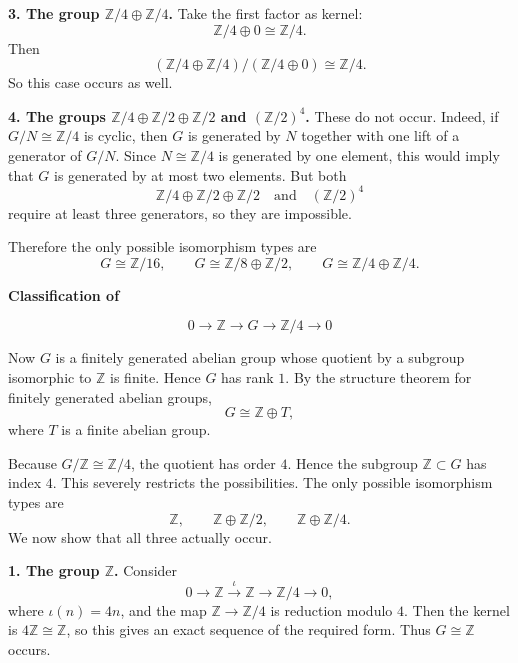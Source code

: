 \begin{solution}
\par

\noindent
\textbf{3. The group \(\mathbb Z/4\oplus \mathbb Z/4\).}
Take the first factor as kernel:
\[
\mathbb Z/4\oplus 0 \cong \mathbb Z/4.
\]
Then
\[
(\mathbb Z/4\oplus \mathbb Z/4)/(\mathbb Z/4\oplus 0)\cong \mathbb Z/4.
\]
So this case occurs as well.

\par

\noindent
\textbf{4. The groups \(\mathbb Z/4\oplus \mathbb Z/2\oplus \mathbb Z/2\) and \((\mathbb Z/2)^4\).}
These do not occur. Indeed, if \(G/N\cong \mathbb Z/4\) is cyclic, then \(G\) is generated by \(N\) together with one lift of a generator of \(G/N\). Since \(N\cong \mathbb Z/4\) is generated by one element, this would imply that \(G\) is generated by at most two elements. But both
\[
\mathbb Z/4\oplus \mathbb Z/2\oplus \mathbb Z/2
\quad \text{and} \quad
(\mathbb Z/2)^4
\]
require at least three generators, so they are impossible.

Therefore the only possible isomorphism types are
\[
\boxed{
	G\cong \mathbb Z/16,
	\qquad
	G\cong \mathbb Z/8\oplus \mathbb Z/2,
	\qquad
	G\cong \mathbb Z/4\oplus \mathbb Z/4.
}
\]


\medskip
\noindent\textbf{Classification of}\par
\smallskip

\[
0\longrightarrow \mathbb Z \longrightarrow G \longrightarrow \mathbb Z/4 \longrightarrow 0
\]

\noindent
Now \(G\) is a finitely generated abelian group whose quotient by a subgroup isomorphic to \(\mathbb Z\) is finite. Hence \(G\) has rank \(1\). By the structure theorem for finitely generated abelian groups,
\[
G\cong \mathbb Z\oplus T,
\]
where \(T\) is a finite abelian group.

Because \(G/\mathbb Z\cong \mathbb Z/4\), the quotient has order \(4\). Hence the subgroup \(\mathbb Z\subset G\) has index \(4\). This severely restricts the possibilities. The only possible isomorphism types are
\[
\mathbb Z,\qquad \mathbb Z\oplus \mathbb Z/2,\qquad \mathbb Z\oplus \mathbb Z/4.
\]
We now show that all three actually occur.

\par

\noindent
\textbf{1. The group \(\mathbb Z\).}
Consider
\[
0\longrightarrow \mathbb Z \overset{\iota}{\longrightarrow} \mathbb Z \longrightarrow \mathbb Z/4 \longrightarrow 0,
\]
where \(\iota(n)=4n\), and the map \(\mathbb Z\to \mathbb Z/4\) is reduction modulo \(4\). Then the kernel is \(4\mathbb Z\cong \mathbb Z\), so this gives an exact sequence of the required form. Thus \(G\cong \mathbb Z\) occurs.


\end{solution}
